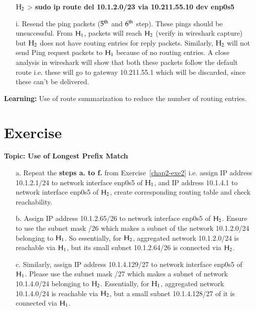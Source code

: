 \begin{multicols}{2}
\begin{itemize}
${\rm H}_{2}$ > \textbf{sudo ip route del 10.1.2.0/23 via 10.211.55.10 dev enp0s5}

\item[i.] Resend the ping packets ($5^{\rm th}$ and $6^{\rm th}$ step). These pings should be unsuccessful. From ${\rm H}_{1}$, packets will reach ${\rm H}_{2}$ (verify in wireshark capture) but ${\rm H}_{2}$ does not have routing entries for reply packets.  Similarly, ${\rm H}_{2}$ will not send Ping request packets to ${\rm H}_{1}$ because of no routing entries. A close analysis in wireshark will show that both these packets follow the default route i.e. these will go to gateway 10.211.55.1 which will be discarded, since these can’t be delivered.
\end{itemize}

\vspace{-.5cm}

\textbf{Learning:} Use of route summarization to reduce the number of routing entries.

\vspace{-.5cm}

\section*{Exercise \label{chap2-exe4}}

\textbf{Topic: Use of Longest Prefix Match}

\vspace{-.5cm}

\begin{itemize}
\item[a.] Repeat the \textbf{steps a. to f.} from  Exercise~\ref{chap2-exe2} i.e. assign IP address 10.1.2.1/24 to network interface enp0s5 of ${\rm H}_{1}$, and IP address 10.1.4.1 to network interface enp0s5 of ${\rm H}_{2}$, create corresponding routing table and check reachability.

\item[b.] Assign IP address 10.1.2.65/26 to network interface enp0s5 of ${\rm H}_{2}$. Ensure to use the subnet mask /26 which makes a subnet of the network 10.1.2.0/24 belonging to ${\rm H}_{1}$. So essentially, for ${\rm H}_{2}$, aggregated network 10.1.2.0/24 is reachable via ${\rm H}_{1}$, but its small subnet 10.1.2.64/26 is connected via ${\rm H}_{2}$.

\item[c.] Similarly, assign IP address 10.1.4.129/27 to network interface enp0s5 of ${\rm H}_{1}$. Please use the subnet mask /27 which makes a subnet of network 10.1.4.0/24 belonging to ${\rm H}_{2}$. Essentially, for ${\rm H}_{1}$, aggregated network 10.1.4.0/24 is reachable via ${\rm H}_{2}$, but a small subnet 10.1.4.128/27 of it is connected via ${\rm H}_{1}$.


\end{itemize}
\end{multicols}
